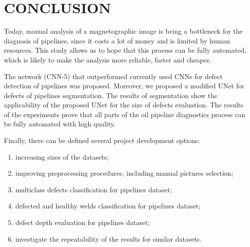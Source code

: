 \section{CONCLUSION}
\label{CONCLUSION}
Today, manual analysis of a magnetographic image is being a bottleneck for the diagnosis of pipelines, since it costs a lot of money and is limited by human resources.
This study allows us to hope that this process can be fully automated, which is likely to make the analysis more reliable, faster and cheaper.

The network (CNN-5) that outperformed currently used CNNs for defect detection of pipelines was proposed.
Moreover, we proposed a modified UNet for defects of pipelines segmentation.
The results of segmentation show the applicability of the proposed UNet for the size of defects evaluation.
The results of the experiments prove that all parts of the oil pipeline diagnostics process can be fully automated with high quality.

Finally, there can be defined several project development options:
\begin{enumerate}
	\item increasing sizes of the datasets;
	\item improving preprocessing procedures, including manual pictures selection;
	\item multiclass defects classification for pipelines dataset;
	\item defected and healthy welds classification for pipelines dataset;
	\item defect depth evaluation for pipelines dataset;
	\item investigate the repeatability of the results for similar datasets.
\end{enumerate}